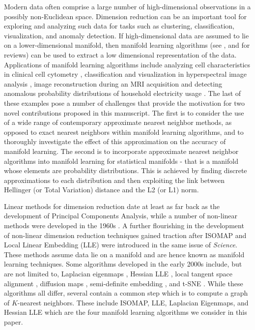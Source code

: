 \documentclass[11pt,a4paper,]{article}
\begin{document}
Modern data often comprise a large number of high-dimensional observations in a possibly non-Euclidean space. Dimension reduction can be an important tool for exploring and analyzing such data for tasks such as clustering, classification, visualization, and anomaly detection. If high-dimensional data are assumed to lie on a lower-dimensional manifold, then
manifold learning algorithms (see \textcite{Cayton2005-dp}, \textcite{Lee2007-wq} and \textcite{Izenman2012-mx} for reviews) can be used to extract a low dimensional representation of the data. Applications of manifold learning algorithms include analyzing cell characteristics in clinical cell cytometry \autocite{Carter2009-ti}, classification and visualization in hyperspectral image analysis \autocite{Lunga2014-kc}, image reconstruction during an MRI acquisition \autocite{Zhu2018-jw} and detecting anomalous probability distributions of household electricity usage \autocite{Hyndman2018-ia}. The last of these examples pose a number of challenges that provide the motivation for two novel contributions proposed in this manuscript. The first is to consider the use of a wide range of contemporary approximate nearest neighbor methods, as opposed to exact nearest neighbors within manifold learning algorithms, and to thoroughly investigate the effect of this approximation on the accuracy of manifold learning. The second is to incorporate approximate nearest neighbor algorithms into manifold learning for statistical manifolds - that is a manifold whose elements are probability distributions. This is achieved by finding discrete approximations to each distribution and then exploiting the link between Hellinger (or Total Variation) distance and the L2 (or L1) norm.

Linear methods for dimension reduction date at least as far back as the development of Principal Components Analysis, while a number of non-linear methods were developed in the 1960s \autocite{Shepard1962-ac,Shepard1962-ft,Kruskal1964-iv,Kruskal1964-md}. A further flourishing in the development of non-linear dimension reduction techniques gained traction after ISOMAP \autocite{Tenenbaum2000-fr} and Local Linear Embedding (LLE) \autocite{Roweis2000-ni} were introduced in the same issue of \emph{Science}. These methods assume data lie on a manifold and are hence known as manifold learning techniques. Some algorithms developed in the early 2000s include, but are not limited to, Laplacian eigenmaps \autocite{Belkin2003-kz}, Hessian LLE \autocite{Donoho2003-am}, local tangent space alignment \autocite{Zhang2003-yi}, diffusion maps \autocite{Nadler2006-cm,Coifman2006-no}, semi-definite embedding \autocite{Weinberger2006-dc}, and t-SNE \autocite{Maaten2008-dw}. While these algorithms all differ, several contain a common step which is to compute a graph of \(K\)-nearest neighbors. These include ISOMAP, LLE, Laplacian Eigenmaps, and Hessian LLE which are the four manifold learning algorithms we consider in this paper.
\end{document}
